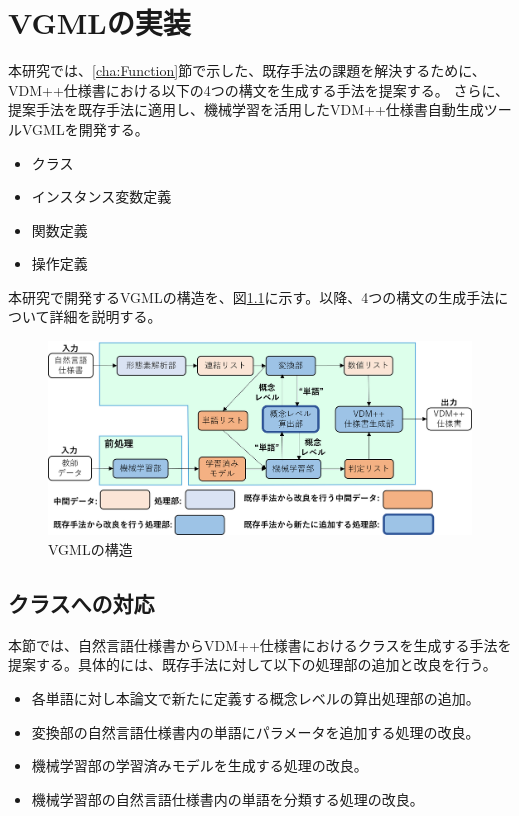 \chapter{VGMLの実装}\label{cha:Implementation}

本研究では、\ref{cha:Function}節で示した、既存手法の課題を解決するために、VDM++仕様書における以下の4つの構文を生成する手法を提案する。
さらに、提案手法を既存手法に適用し、機械学習を活用したVDM++仕様書自動生成ツールVGMLを開発する。

\begin{itemize}
    \item クラス
    \item インスタンス変数定義
    \item 関数定義
    \item 操作定義
\end{itemize}

本研究で開発するVGMLの構造を、図\ref{fig:vgml_structure}に示す。以降、4つの構文の生成手法について詳細を説明する。

\begin{figure}[t]
    \begin{center}
        \includegraphics[width=1.0\columnwidth]{image/vgml_structure.png}
        \caption{VGMLの構造}
        \label{fig:vgml_structure}
    \end{center}
\end{figure}

\section{クラスへの対応}
本節では、自然言語仕様書からVDM++仕様書におけるクラスを生成する手法を提案する。具体的には、既存手法に対して以下の処理部の追加と改良を行う。

\begin{itemize}
    \item 各単語に対し本論文で新たに定義する概念レベルの算出処理部の追加。
    \item 変換部の自然言語仕様書内の単語にパラメータを追加する処理の改良。
    \item 機械学習部の学習済みモデルを生成する処理の改良。
    \item 機械学習部の自然言語仕様書内の単語を分類する処理の改良。
\end{itemize}

